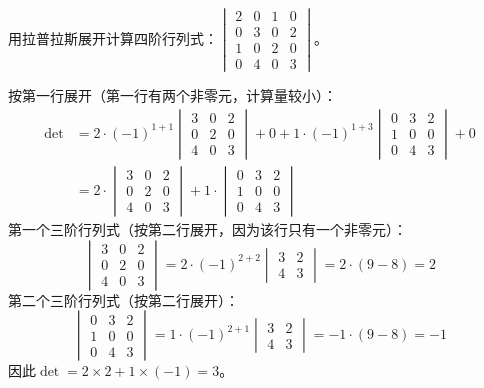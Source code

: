 \begin{example}
用拉普拉斯展开计算四阶行列式：$\begin{vmatrix}2&0&1&0\\0&3&0&2\\1&0&2&0\\0&4&0&3\end{vmatrix}$。
\end{example}
\begin{solution}
按第一行展开（第一行有两个非零元，计算量较小）：
\begin{align*}
\det &= 2\cdot(-1)^{1+1}\begin{vmatrix}3&0&2\\0&2&0\\4&0&3\end{vmatrix}
+ 0 + 1\cdot(-1)^{1+3}\begin{vmatrix}0&3&2\\1&0&0\\0&4&3\end{vmatrix}
+ 0\\[2pt]
&= 2\cdot\begin{vmatrix}3&0&2\\0&2&0\\4&0&3\end{vmatrix}
+ 1\cdot\begin{vmatrix}0&3&2\\1&0&0\\0&4&3\end{vmatrix}
\end{align*}
第一个三阶行列式（按第二行展开，因为该行只有一个非零元）：
\[
\begin{vmatrix}3&0&2\\0&2&0\\4&0&3\end{vmatrix}
= 2\cdot(-1)^{2+2}\begin{vmatrix}3&2\\4&3\end{vmatrix}
= 2\cdot(9-8)=2
\]
第二个三阶行列式（按第二行展开）：
\[
\begin{vmatrix}0&3&2\\1&0&0\\0&4&3\end{vmatrix}
= 1\cdot(-1)^{2+1}\begin{vmatrix}3&2\\4&3\end{vmatrix}
= -1\cdot(9-8)=-1
\]
因此$\det = 2\times2 + 1\times(-1) = 3$。
\end{solution}

